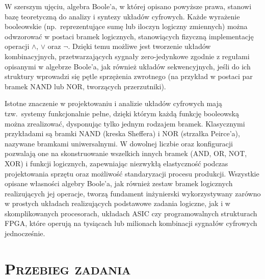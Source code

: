 \documentclass[,a4paper,12pt]{article}
\renewcommand{\cite}{\supercite}
\begin{document}
W szerszym ujęciu, algebra Boole'a, w której opisano powyższe prawa, stanowi bazę teoretyczną do analizy i syntezy układów cyfrowych. Każde wyrażenie booleowskie (np.~reprezentujące sumę lub iloczyn logiczny zmiennych) można odwzorować w postaci bramek logicznych, stanowiących fizyczną implementację operacji \(\land\), \(\lor\) oraz \(\neg\). Dzięki temu możliwe jest tworzenie układów kombinacyjnych, przetwarzających sygnały zero-jedynkowe zgodnie z regułami opisanymi w algebrze Boole'a, jak również układów sekwencyjnych, jeśli do ich struktury wprowadzi się pętle sprzężenia zwrotnego (na przykład w postaci par bramek NAND lub NOR, tworzących przerzutniki).\cite{CEAutomatyki}

Istotne znaczenie w projektowaniu i analizie układów cyfrowych mają tzw.\ systemy funkcjonalnie pełne, dzięki którym każdą funkcję booleowską można zrealizować, dysponując tylko jednym rodzajem bramek. Klasycznymi przykładami są bramki NAND (kreska Sheffera) i NOR (strzałka Peirce’a), nazywane bramkami uniwersalnymi. W dowolnej liczbie oraz konfiguracji pozwalają one na skonstruowanie wszelkich innych bramek (AND, OR, NOT, XOR) i funkcji logicznych, zapewniając niezwykłą elastyczność podczas projektowania sprzętu oraz możliwość standaryzacji procesu produkcji.\cite{WikipediaFunctionalCompleteness} Wszystkie opisane własności algebry Boole'a, jak również zestaw bramek logicznych realizujących jej operacje, tworzą fundament inżynierski wykorzystywany zarówno w prostych układach realizujących podstawowe zadania logiczne, jak i w skomplikowanych procesorach, układach ASIC czy programowalnych strukturach FPGA, które operują na tysiącach lub milionach kombinacji sygnałów cyfrowych jednocześnie.\cite{WikipediaLogicGate}

\section{\textsc{Przebieg zadania}}
\end{document}
